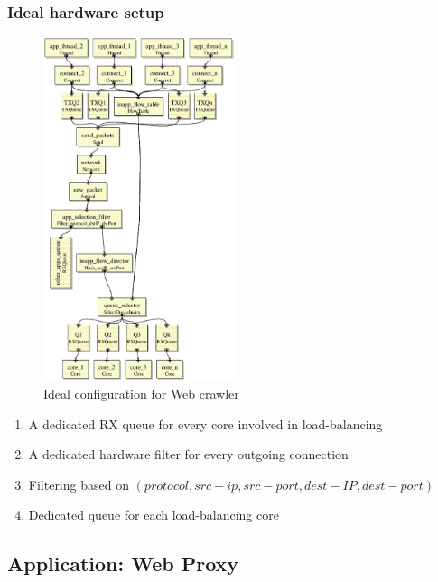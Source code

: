 \subsubsection{Ideal hardware setup}

\begin{figure}[t]
\centering
\includegraphics[width=0.5\textwidth]{figures/WebCrawlerIdeal.eps}
\caption{Ideal configuration for Web crawler}
\end{figure}

\begin{enumerate}
    \item A dedicated RX queue for every core involved in load-balancing
    \item A dedicated hardware filter for every outgoing connection
    \item Filtering based on $(protocol, src-ip, src-port,  dest-IP, dest-port)$
    \item Dedicated queue for each load-balancing core
\end{enumerate}

\subsection{Application: Web Proxy}

